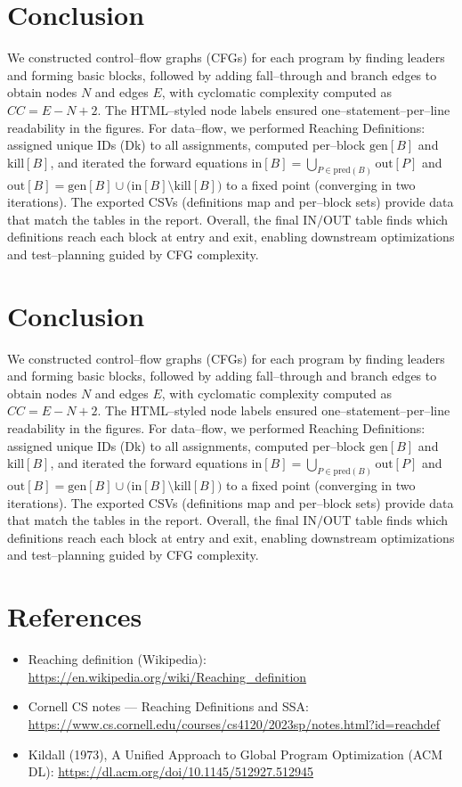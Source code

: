 \documentclass[12pt, a4paper]{report}
\begin{document}
\section*{Conclusion}
We constructed control–flow graphs (CFGs) for each program by finding leaders and forming basic blocks, followed by adding fall–through and branch edges to obtain nodes \(N\) and edges \(E\), with cyclomatic complexity computed as \(CC = E - N + 2\). The HTML–styled node labels ensured one–statement–per–line readability in the figures. For data–flow, we performed Reaching Definitions: assigned unique IDs (Dk) to all assignments, computed per–block \(\mathrm{gen}[B]\) and \(\mathrm{kill}[B]\), and iterated the forward equations \( \mathrm{in}[B] = \bigcup_{P \in \mathrm{pred}(B)} \mathrm{out}[P] \) and \( \mathrm{out}[B] = \mathrm{gen}[B] \cup \bigl(\mathrm{in}[B] \setminus \mathrm{kill}[B]\bigr) \) to a fixed point (converging in two iterations). The exported CSVs (definitions map and per–block sets) provide data that match the tables in the report. Overall, the final \(\mathrm{IN}/\mathrm{OUT}\) table finds which definitions reach each block at entry and exit, enabling downstream optimizations and test–planning guided by CFG complexity.

\section*{Conclusion}
We constructed control–flow graphs (CFGs) for each program by finding leaders and forming basic blocks, followed by adding fall–through and branch edges to obtain nodes \(N\) and edges \(E\), with cyclomatic complexity computed as \(CC = E - N + 2\). The HTML–styled node labels ensured one–statement–per–line readability in the figures. For data–flow, we performed Reaching Definitions: assigned unique IDs (Dk) to all assignments, computed per–block \(\mathrm{gen}[B]\) and \(\mathrm{kill}[B]\), and iterated the forward equations \( \mathrm{in}[B] = \bigcup_{P \in \mathrm{pred}(B)} \mathrm{out}[P] \) and \( \mathrm{out}[B] = \mathrm{gen}[B] \cup \bigl(\mathrm{in}[B] \setminus \mathrm{kill}[B]\bigr) \) to a fixed point (converging in two iterations). The exported CSVs (definitions map and per–block sets) provide data that match the tables in the report. Overall, the final \(\mathrm{IN}/\mathrm{OUT}\) table finds which definitions reach each block at entry and exit, enabling downstream optimizations and test–planning guided by CFG complexity.



\section*{References}
\begin{itemize}
  \item Reaching definition (Wikipedia): \url{https://en.wikipedia.org/wiki/Reaching_definition}
  \item Cornell CS notes — Reaching Definitions and SSA: \url{https://www.cs.cornell.edu/courses/cs4120/2023sp/notes.html?id=reachdef}
  \item Kildall (1973), A Unified Approach to Global Program Optimization (ACM DL): \url{https://dl.acm.org/doi/10.1145/512927.512945}
\end{itemize}
\end{document}
